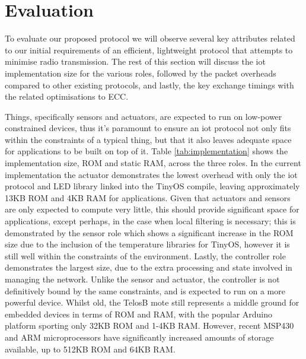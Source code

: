 \documentclass[conference]{./sty/IEEEtran}
\begin{document}
\section{Evaluation} %
\label{sec:evaluation}
To evaluate our proposed protocol we will observe several key attributes related to our initial requirements of an efficient, lightweight protocol that attempts to minimise radio transmission. The rest of this section will discuss the iot implementation size for the various roles, followed by the packet overheads compared to other existing protocols, and lastly, the key exchange timings with the related optimisations to ECC.

Things, specifically sensors and actuators, are expected to run on low-power constrained devices, thus it's paramount to ensure an iot protocol not only fits within the constraints of a typical thing, but that it also leaves adequate space for applications to be built on top of it. Table \ref{tab:implementation} shows the implementation size, ROM and static RAM, across the three roles. In the current implementation the actuator demonstrates the lowest overhead with only the iot protocol and LED library linked into the TinyOS compile, leaving approximately 13KB ROM and 4KB RAM for applications. Given that actuators and sensors are only expected to compute very little, this should provide significant space for applications, except perhaps, in the case when local filtering is necessary; this is demonstrated by the sensor role which shows a significant increase in the ROM size due to the inclusion of the temperature libraries for TinyOS, however it is still well within the constraints of the environment. Lastly, the controller role demonstrates the largest size, due to the extra processing and state involved in managing the network. Unlike the sensor and actuator, the controller is not definitively bound by the same constraints, and is expected to run on a more powerful device. Whilst old, the TelosB mote still represents a middle ground for embedded devices in terms of ROM and RAM, with the popular Arduino platform sporting only 32KB ROM and 1-4KB RAM. However, recent MSP430 and ARM microprocessors have significantly increased amounts of storage available, up to 512KB ROM and 64KB RAM.
\end{document}
